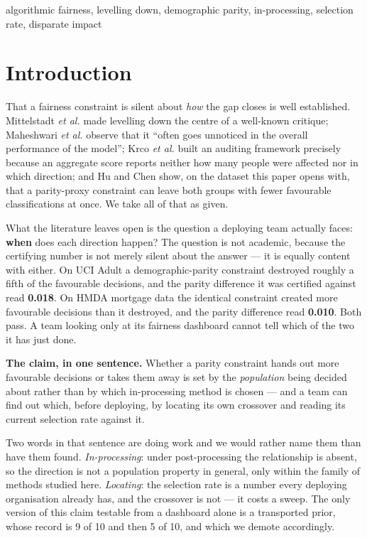 \documentclass[conference]{IEEEtran}
\begin{document}
\begin{IEEEkeywords}
algorithmic fairness, levelling down, demographic parity, in-processing, selection rate,
disparate impact
\end{IEEEkeywords}

\section{Introduction}

That a fairness constraint is silent about \emph{how} the gap closes is well established.
Mittelstadt \emph{et al.} \cite{mittelstadt2023} made levelling down the centre of a
well-known critique; Maheshwari \emph{et al.} \cite{maheshwari2023} observe that it ``often
goes unnoticed in the overall performance of the model''; Krco \emph{et al.} \cite{ferry2023}
built an auditing framework precisely because an aggregate score reports neither how many
people were affected nor in which direction; and Hu and Chen \cite{hu2020} show, on the
dataset this paper opens with, that a parity-proxy constraint can leave both groups with fewer
favourable classifications at once. We take all of that as given.

What the literature leaves open is the question a deploying team actually faces:
\textbf{when} does each direction happen? The question is not academic, because the
certifying number is not merely silent about the answer --- it is equally content with
either. On UCI Adult a demographic-parity constraint destroyed roughly a fifth of the
favourable decisions, and the parity difference it was certified against read
\textbf{0.018}. On HMDA mortgage data the identical constraint created more favourable
decisions than it destroyed, and the parity difference read \textbf{0.010}. Both pass. A
team looking only at its fairness dashboard cannot tell which of the two it has just done.

\textbf{The claim, in one sentence.} Whether a parity constraint hands out more favourable
decisions or takes them away is set by the \emph{population} being decided about rather than
by which in-processing method is chosen --- and a team can find out which, before deploying,
by locating its own crossover and reading its current selection rate against it.

Two words in that sentence are doing work and we would rather name them than have them found.
\emph{In-processing}: under post-processing the relationship is absent, so the direction is
not a population property in general, only within the family of methods studied here.
\emph{Locating}: the selection rate is a number every deploying organisation already has, and
the crossover is not --- it costs a sweep. The only version of this claim testable from a
dashboard alone is a transported prior, whose record is 9 of 10 and then 5 of 10, and which we
demote accordingly.
\end{document}
